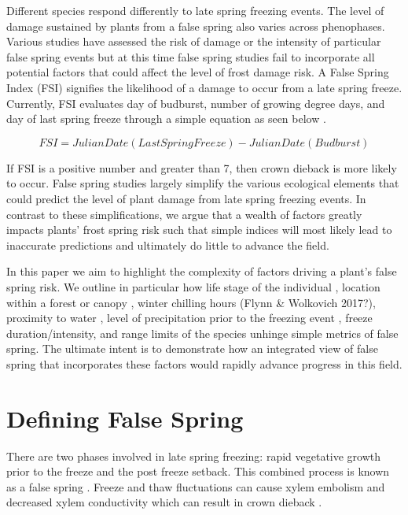 \documentclass{article}\usepackage[]{graphicx}\usepackage[]{color}
\begin{document}
Different species respond differently to late spring freezing events. The level of damage sustained by plants from a false spring also varies across phenophases. Various studies have assessed the risk of damage or the intensity of particular false spring events but at this time false spring studies fail to incorporate all potential factors that could affect the level of frost damage risk. A False Spring Index (FSI) signifies the likelihood of a damage to occur from a late spring freeze. Currently, FSI evaluates day of budburst, number of growing degree days, and day of last spring freeze through a simple equation as seen below \citep{Marino2011}. 

\[ FSI = Julian Date (Last Spring Freeze) - Julian Date (Budburst) \]

If FSI is a positive number and greater than 7, then crown dieback is more likely to occur. False spring studies largely simplify the various ecological elements that could predict the level of plant damage from late spring freezing events. In contrast to these simplifications, we argue that a wealth of factors greatly impacts plants' frost spring risk such that simple indices will most likely lead to inaccurate predictions and ultimately do little to advance the field. 

In this paper we aim to highlight the complexity of factors driving a plant's false spring risk. We outline in particular how life stage of the individual \citep{Caffarra2011}, location within a forest or canopy \citep{Augspurger2013}, winter chilling hours (Flynn \& Wolkovich 2017?), proximity to water \citep{Gu2008}, level of precipitation prior to the freezing event \citep{Anderegg2013}, freeze duration/intensity, and range limits of the species \citep{Martin2010} unhinge simple metrics of false spring. The ultimate intent is to demonstrate how an integrated view of false spring that incorporates these factors would rapidly advance progress in this field.  

\section{Defining False Spring}
There are two phases involved in late spring freezing: rapid vegetative growth prior to the freeze and the post freeze setback. This combined process is known as a false spring \citep{Gu2008}. Freeze and thaw fluctuations can cause xylem embolism and decreased xylem conductivity which can result in crown dieback \citep{Gu2008}.
\end{document}
